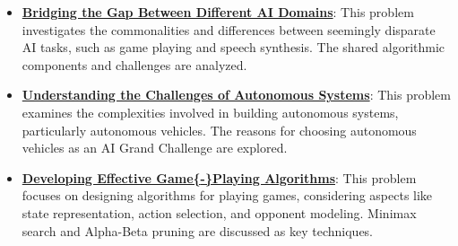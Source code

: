 \documentclass{article}%
\begin{document}
\begin{itemize}[leftmargin=*]
\item \href{https://purdue.brightspace.com/d2l/common/assets/pdfjs-d2l-dist/1.0.14-legacy/web/viewer.html?file=\%2Fcontent\%2Fenforced\%2F1095467-wl.202510.CS.24300.001\%2F02L2-Intro.pdf\%3Fou\%3D1095467\&lang=en-us\&container=d2l-fileviewer-rendered-pdf\&fullscreen=d2l-fileviewer-rendered-pdf-dialog\&height=667#page=31}{\textbf{Bridging the Gap Between Different AI Domains}}: This problem investigates the commonalities and differences between seemingly disparate AI tasks, such as game playing and speech synthesis. The shared algorithmic components and challenges are analyzed.%
\item \href{https://purdue.brightspace.com/d2l/common/assets/pdfjs-d2l-dist/1.0.14-legacy/web/viewer.html?file=\%2Fcontent\%2Fenforced\%2F1095467-wl.202510.CS.24300.001\%2F02L2-Intro.pdf\%3Fou\%3D1095467\&lang=en-us\&container=d2l-fileviewer-rendered-pdf\&fullscreen=d2l-fileviewer-rendered-pdf-dialog\&height=667#page=43}{\textbf{Understanding the Challenges of Autonomous Systems}}: This problem examines the complexities involved in building autonomous systems, particularly autonomous vehicles. The reasons for choosing autonomous vehicles as an AI Grand Challenge are explored.%
\item \href{https://purdue.brightspace.com/d2l/common/assets/pdfjs-d2l-dist/1.0.14-legacy/web/viewer.html?file=\%2Fcontent\%2Fenforced\%2F1095467-wl.202510.CS.24300.001\%2F02L2-Intro.pdf\%3Fou\%3D1095467\&lang=en-us\&container=d2l-fileviewer-rendered-pdf\&fullscreen=d2l-fileviewer-rendered-pdf-dialog\&height=667#page=22}{\textbf{Developing Effective Game\{{-}\}Playing Algorithms}}: This problem focuses on designing algorithms for playing games, considering aspects like state representation, action selection, and opponent modeling. Minimax search and Alpha{-}Beta pruning are discussed as key techniques.%
\end{itemize}%
\end{document}
